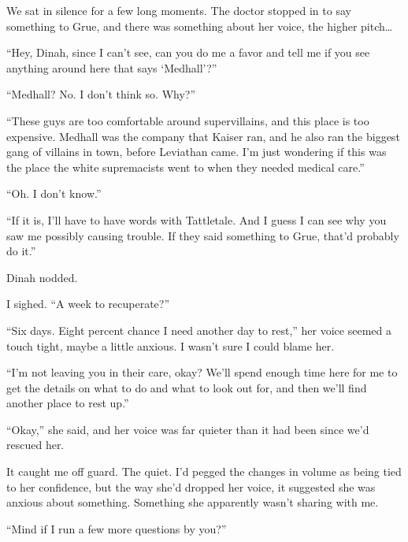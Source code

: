 We sat in silence for a few long moments.  The doctor stopped in to say something to Grue, and there was something about her voice, the higher pitch\ldots



``Hey, Dinah, since I can't see, can you do me a favor and tell me if you see anything around here that says `Medhall'?''



``Medhall?  No.  I don't think so.  Why?''



``These guys are too comfortable around supervillains, and this place is too expensive.  Medhall was the company that Kaiser ran, and he also ran the biggest gang of villains in town, before Leviathan came.  I'm just wondering if this was the place the white supremacists went to when they needed medical care.''



``Oh.  I don't know.''



``If it is, I'll have to have words with Tattletale.  And I guess I can see why you saw me possibly causing trouble.  If they said something to Grue, that'd probably do it.''



Dinah nodded.



I sighed.  ``A week to recuperate?''



``Six days.  Eight percent chance I need another day to rest,'' her voice seemed a touch tight, maybe a little anxious.  I wasn't sure I could blame her.



``I'm not leaving you in their care, okay?  We'll spend enough time here for me to get the details on what to do and what to look out for, and then we'll find another place to rest up.''



``Okay,'' she said, and her voice was far quieter than it had been since we'd rescued her.



It caught me off guard.  The quiet.  I'd pegged the changes in volume as being tied to her confidence, but the way she'd dropped her voice, it suggested she was anxious about something.  Something she apparently wasn't sharing with me.



``Mind if I run a few more questions by you?''



